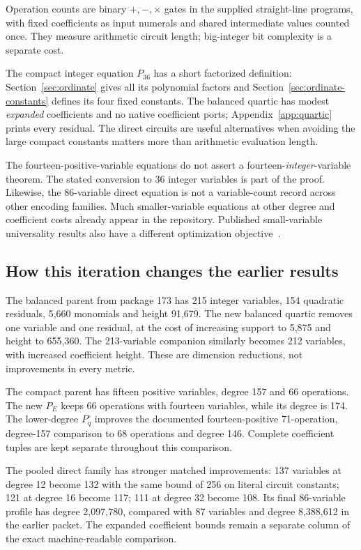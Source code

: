 \documentclass[11pt]{article}
\begin{document}
Operation counts are binary $+,-,\times$ gates in the supplied
straight-line programs, with fixed coefficients as input numerals
and shared intermediate values counted once. They measure arithmetic
circuit length; big-integer bit complexity is a separate cost.

The compact integer equation $P_{36}$ has a short factorized definition:
Section~\ref{sec:ordinate} gives all its polynomial factors and
Section~\ref{sec:ordinate-constants} defines its four fixed constants.
The balanced quartic has modest \emph{expanded} coefficients and no
native coefficient ports; Appendix~\ref{app:quartic} prints every residual.
The direct circuits are useful alternatives when avoiding the large
compact constants matters more than arithmetic evaluation length.

The fourteen-positive-variable equations do not assert a
fourteen-\emph{integer}-variable theorem. The stated conversion to 36
integer variables is part of the proof. Likewise, the 86-variable direct
equation is not a variable-count record across other encoding families.
Much smaller-variable equations at other degree and coefficient costs
already appear in the repository. Published small-variable universality
results also have a different optimization objective~\cite{sun2026}.

\subsection{How this iteration changes the earlier results}

The balanced parent from package 173 has 215 integer variables, 154
quadratic residuals, 5,660 monomials and height 91,679. The new balanced
quartic removes one variable and one residual, at the cost of increasing
support to 5,875 and height to 655,360. The 213-variable companion
similarly becomes 212 variables, with increased coefficient height.
These are dimension reductions, not improvements in every metric.

The compact parent has fifteen positive variables, degree 157 and 66
operations. The new $P_E$ keeps 66 operations with fourteen variables,
while its degree is 174. The lower-degree $P_q^\circ$ improves the
documented fourteen-positive 71-operation, degree-157 comparison to
68 operations and degree 146. Complete coefficient tuples are kept
separate throughout this comparison.

The pooled direct family has stronger matched improvements:
137 variables at degree 12 become 132 with the same bound of 256 on
literal circuit constants; 121 at degree 16 become 117; 111 at degree 32
become 108. Its final 86-variable profile has degree 2,097,780, compared
with 87 variables and degree 8,388,612 in the earlier packet. The
expanded coefficient bounds remain a separate column of the exact
machine-readable comparison.
\end{document}
